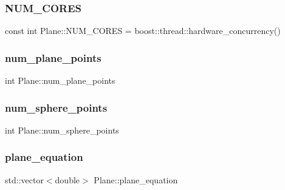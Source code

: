 \subsubsection{\texorpdfstring{N\+U\+M\+\_\+\+C\+O\+R\+ES}{NUM\_CORES}}
{\footnotesize\ttfamily const int Plane\+::\+N\+U\+M\+\_\+\+C\+O\+R\+ES = boost\+::thread\+::hardware\+\_\+concurrency()\hspace{0.3cm}{\ttfamily [private]}}

\hypertarget{class_plane_a59841c6147cdc9a25d7f6d9669ff6fd2}{}\label{class_plane_a59841c6147cdc9a25d7f6d9669ff6fd2} 
\subsubsection{\texorpdfstring{num\+\_\+plane\+\_\+points}{num\_plane\_points}}
{\footnotesize\ttfamily int Plane\+::num\+\_\+plane\+\_\+points\hspace{0.3cm}{\ttfamily [private]}}

\hypertarget{class_plane_a3a7e69fb4f98c716cb403be89beded4c}{}\label{class_plane_a3a7e69fb4f98c716cb403be89beded4c} 
\subsubsection{\texorpdfstring{num\+\_\+sphere\+\_\+points}{num\_sphere\_points}}
{\footnotesize\ttfamily int Plane\+::num\+\_\+sphere\+\_\+points\hspace{0.3cm}{\ttfamily [private]}}

\hypertarget{class_plane_afdf256b7ed2934c1dca9a09beb8c483e}{}\label{class_plane_afdf256b7ed2934c1dca9a09beb8c483e} 
\subsubsection{\texorpdfstring{plane\+\_\+equation}{plane\_equation}}
{\footnotesize\ttfamily std\+::vector$<$double$>$ Plane\+::plane\+\_\+equation\hspace{0.3cm}{\ttfamily [private]}}

\hypertarget{class_plane_a5efd74ec0c24a0cac7778705d6134452}{}\label{class_plane_a5efd74ec0c24a0cac7778705d6134452} 

